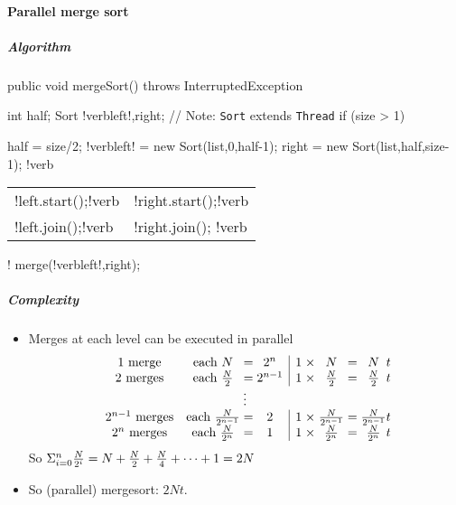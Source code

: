 \documentclass{article}
\begin{document}
\paragraph{Parallel merge sort}
\subparagraph{Algorithm}
\begin{flushleft}
  public void mergeSort() throws InterruptedException {
    int half; Sort !verbleft!,right; // Note: {\tt Sort} extends {\tt Thread}
    if (size > 1) {
      half = size/2;
      !verbleft! = new Sort(list,0,half-1);
      right = new Sort(list,half,size-1);
!verb\begin{tabular}{@{}l@{~}l@{}}!left.start();!verb&!right.start();!verb\\!left.join();!verb&!right.join(); !verb\end{tabular}!
      merge(!verbleft!,right);
    }
  }
\EndSystem
\end{flushleft}


\subparagraph{Complexity}
\begin{itemize} 
\item Merges at each level can be executed in parallel
\begin{displaymath} 
\begin{array}{cc@{\;=\;}c|c@{\;\times\;}c@{\;=\;}c@{t}} 
1~\mbox{merge} & \mbox{each}~N & 2^n & 1 & {N} & {N}\\ 
2~\mbox{merges} & \mbox{each}~{N\over 2} & 2^{n-1} & 1 & {{N\over 2}} & {{N\over 2}}\\ 
\multicolumn{6}{c}{\vdots}\\ 
2^{n-1}~\mbox{merges} & \mbox{each}~{N\over{2^{n-1}}} & 2 & 1 & {{N\over{2^{n-1}}}} & {{N\over{2^{n-1}}}}\\          
2^n~\mbox{merges} & \mbox{each}~{N\over{2^n}} & 1 & 1 & {{N\over{2^n}}} & {{N\over{2^n}}} 
\end{array} 
\end{displaymath} 
So $\Sigma_{i=0}^{n}{N\over{2^i}}=N+{N\over 2}+{N\over 4}+\cdots+1=2N$

\item So (parallel) mergesort: ${2N}t$.
\end{itemize}
\end{document}
